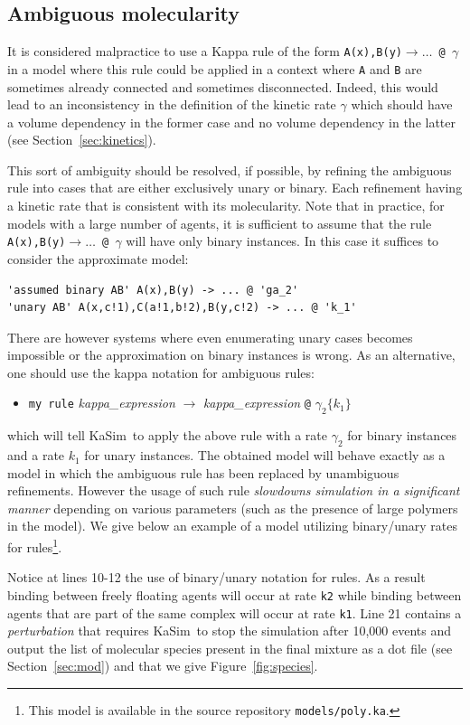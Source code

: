 \documentclass[11pt]{book}
\def\KaSim{\textsf{KaSim}}
\def\ttt#1{\texttt{#1}}
\def\rar{\rightarrow}
\def\ga{\gamma}
\def\ITE#1{\begin{itemize}#1\end{itemize}}
\begin{document}
\subsection{Ambiguous molecularity}\label{sec:ambiguous}

It is considered malpractice to use a Kappa rule of the form \ttt{A(x),B(y)$\rar \dots$ @ $\ga$} in a model where this rule could be applied in a context where \ttt{A} and \ttt{B} are sometimes already connected and sometimes disconnected. Indeed, this would lead to an inconsistency in the definition of the kinetic rate $\ga$ which should have a volume dependency in the former case and no volume dependency in the latter (see Section~\ref{sec:kinetics}).

This sort of ambiguity should be resolved, if possible, by refining the ambiguous rule into cases that are either exclusively unary or binary. Each refinement having a kinetic rate that is consistent with its molecularity. Note that in practice, for models with a large number of agents, it is sufficient to assume that the rule \ttt{A(x),B(y)$\rar \dots$ @ $\ga$} will have only binary instances. In this case it suffices to consider the approximate model:
\begin{lstlisting}[language=kappa]
'assumed binary AB' A(x),B(y) -> ... @ 'ga_2'
'unary AB' A(x,c!1),C(a!1,b!2),B(y,c!2) -> ... @ 'k_1'
\end{lstlisting}

There are however systems where even enumerating unary cases becomes
impossible or the approximation on binary instances is wrong. As an
alternative, one should use the kappa notation for ambiguous rules:
\ITE{
\item[] \ttt{{\textquotesingle}my rule{\textquotesingle}} {\it kappa\_expression} $\rar$ {\it kappa\_expression} \ttt{@} $\ga_2 \{k_1\}$
}
which will tell \KaSim~to apply the above rule with a rate $\ga_2$ for
binary instances and a rate $k_1$ for unary instances. The obtained
model will behave exactly as a model in which the ambiguous rule has
been replaced by unambiguous refinements. However the usage of such
rule \emph{slowdowns simulation in a significant manner}
depending on various parameters (such as the presence of large
polymers in the model). We give below an example of a model utilizing
binary/unary rates for rules\footnote{This model is available in the
  source repository \ttt{models/poly.ka}.}.



Notice at lines 10-12 the use of binary/unary notation for rules. As a
result binding between freely floating agents will occur at rate
\ttt{{\textquotesingle}k2{\textquotesingle}} while binding between
agents that are part of the same complex will occur at rate
\ttt{{\textquotesingle}k1{\textquotesingle}}. Line 21 contains a
\emph{perturbation} that requires \KaSim~to stop the simulation after
10,000 events and output the list of molecular species present in the
final mixture as a dot file (see Section~\ref{sec:mod})
and that we give Figure~\ref{fig:species}.
\end{document}
